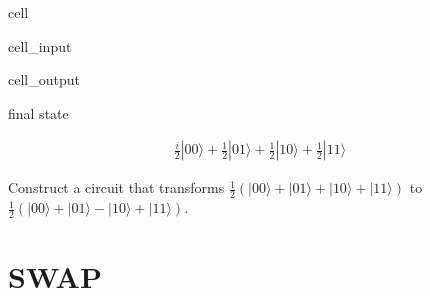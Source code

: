\documentclass[letterpaper,10pt,english]{jupyterBook}
\begin{document}
\begin{sphinxuseclass}{cell}\begin{sphinxVerbatimInput}

\begin{sphinxuseclass}{cell_input}
\begin{sphinxVerbatim}[commandchars=\\\{\}]
\end{sphinxVerbatim}

\end{sphinxuseclass}\end{sphinxVerbatimInput}
\begin{sphinxVerbatimOutput}

\begin{sphinxuseclass}{cell_output}
\begin{sphinxVerbatim}[commandchars=\\\{\}]
final state
\end{sphinxVerbatim}
\begin{equation*}
\begin{split}\frac{i}{2} |00\rangle+\frac{1}{2} |01\rangle+\frac{1}{2} |10\rangle+\frac{1}{2} |11\rangle\end{split}
\end{equation*}
\end{sphinxuseclass}\end{sphinxVerbatimOutput}

\end{sphinxuseclass}
\sphinxAtStartPar
{}

\sphinxAtStartPar
Construct a circuit that transforms \(\frac{1}{2}\left(|00\rangle + |01\rangle + |10\rangle + |11\rangle\right)\) to \(\frac{1}{2}\left(|00\rangle + |01\rangle - |10\rangle + |11\rangle\right)\).

\sphinxstepscope


\section{SWAP}
\label{\detokenize{q2gates/swap:swap}}\label{\detokenize{q2gates/swap::doc}}
\end{document}

